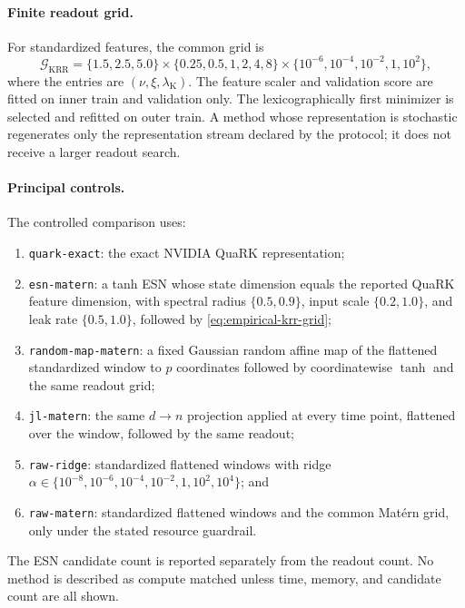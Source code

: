 \paragraph{Finite readout grid.}
For standardized features, the common grid is
\begin{equation}
 \mathcal G_{\mathrm{KRR}}
 =\{1.5,2.5,5.0\}
  \times\{0.25,0.5,1,2,4,8\}
  \times\{10^{-6},10^{-4},10^{-2},1,10^2\},
 \label{eq:empirical-krr-grid}
\end{equation}
where the entries are \((\nu,\xi,\lambda_{\mathrm K})\).  The feature scaler
and validation score are fitted on inner train and validation only.  The
lexicographically first minimizer is selected and refitted on outer train.  A
method whose representation is stochastic regenerates only the representation
stream declared by the protocol; it does not receive a larger readout search.

\paragraph{Principal controls.}
The controlled comparison uses:
\begin{enumerate}
  \item \texttt{quark-exact}: the exact NVIDIA QuaRK representation;
  \item \texttt{esn-matern}: a tanh ESN whose state dimension equals the
        reported QuaRK feature dimension, with spectral radius
        \(\{0.5,0.9\}\), input scale \(\{0.2,1.0\}\), and leak rate
        \(\{0.5,1.0\}\), followed by \cref{eq:empirical-krr-grid};
  \item \texttt{random-map-matern}: a fixed Gaussian random affine map of the
        flattened standardized window to \(p\) coordinates followed by
        coordinatewise \(\tanh\) and the same readout grid;
  \item \texttt{jl-matern}: the same \(d\to n\) projection applied at every
        time point, flattened over the window, followed by the same readout;
  \item \texttt{raw-ridge}: standardized flattened windows with ridge
        \(\alpha\in\{10^{-8},10^{-6},10^{-4},10^{-2},1,10^2,10^4\}\); and
  \item \texttt{raw-matern}: standardized flattened windows and the common
        Mat\'ern grid, only under the stated resource guardrail.
\end{enumerate}
The ESN candidate count is reported separately from the readout count.  No
method is described as compute matched unless time, memory, and candidate count
are all shown.

